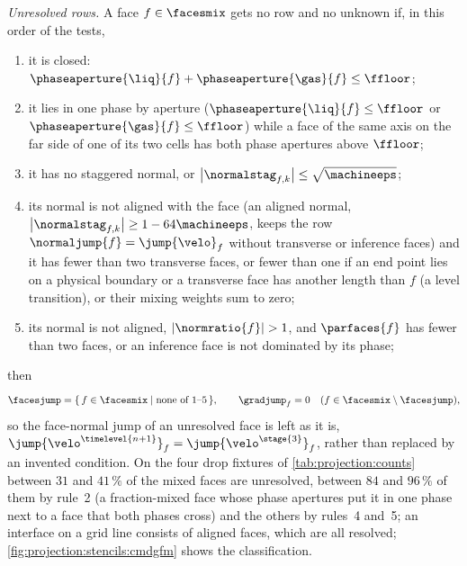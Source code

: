 \emph{Unresolved rows.} A face $f\in\facesmix$ gets no row and no unknown if,
in this order of the tests,
\begin{enumerate}
\item it is closed: $\phaseaperture{\liq}{f}+\phaseaperture{\gas}{f}\le\ffloor$;
\item it lies in one phase by aperture ($\phaseaperture{\liq}{f}\le\ffloor$ or
  $\phaseaperture{\gas}{f}\le\ffloor$) while a face of the same axis on the
  far side of one of its two cells has both phase apertures above $\ffloor$;
\item it has no staggered normal, or $\abs{\normalstag_{f,k}}\le\sqrt{\machineeps}$;
\item its normal is not aligned with the face (an aligned normal,
  $\abs{\normalstag_{f,k}}\ge1-64\machineeps$, keeps the row
  $\normaljump{f}=\jump{\velo}_f$ without transverse or inference faces) and
  it has fewer than two transverse faces, or fewer than one if an end point
  lies on a physical boundary or a transverse face has another length than
  $f$ (a level transition), or their mixing weights sum to zero;
\item its normal is not aligned, $\abs{\normratio{f}}>1$, and $\parfaces{f}$
  has fewer than two faces, or an inference face is not dominated by its
  phase;
\end{enumerate}
then
\begin{equation}\label{eq:projection:unresolved}
  \facesjump=\set{f\in\facesmix}{\text{none of 1--5}},\qquad
  \gradjump_f=0\quad(f\in\facesmix\setminus\facesjump),
\end{equation}
so the face-normal jump of an unresolved face is left as it is,
$\jump{\velo^{\timelevel{n+1}}}_f=\jump{\velo^{\stage{3}}}_f$, rather than
replaced by an invented condition. On the four drop fixtures of
\cref{tab:projection:counts} between $31$ and $41\,\%$ of the mixed faces are
unresolved, between $84$ and $96\,\%$ of them by rule~2 (a fraction-mixed
face whose phase apertures put it in one phase next to a face that both
phases cross) and the others by rules~4 and~5; an interface on a grid line
consists of aligned faces, which are all resolved;
\cref{fig:projection:stencils:cmdgfm} shows the classification.

